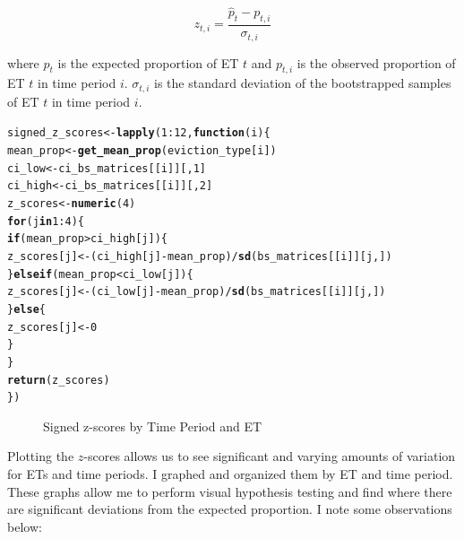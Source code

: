 \documentclass{article}\usepackage[]{graphicx}\usepackage[]{xcolor}
\makeatletter
\newcommand{\hlnum}[1]{\textcolor[rgb]{0.686,0.059,0.569}{#1}}%
\newcommand{\hlopt}[1]{\textcolor[rgb]{0,0,0}{#1}}%
\newcommand{\hlstd}[1]{\textcolor[rgb]{0.345,0.345,0.345}{#1}}%
\newcommand{\hlkwa}[1]{\textcolor[rgb]{0.161,0.373,0.58}{\textbf{#1}}}%
\newcommand{\hlkwb}[1]{\textcolor[rgb]{0.69,0.353,0.396}{#1}}%
\newcommand{\hlkwc}[1]{\textcolor[rgb]{0.333,0.667,0.333}{#1}}%
\newcommand{\hlkwd}[1]{\textcolor[rgb]{0.737,0.353,0.396}{\textbf{#1}}}%
\newenvironment{kframe}{%
 \def\at@end@of@kframe{}%
 \ifinner\ifhmode%
  \def\at@end@of@kframe{\end{minipage}}%
  \begin{minipage}{\columnwidth}%
 \fi\fi%
 \def\FrameCommand##1{\hskip\@totalleftmargin \hskip-\fboxsep
 \colorbox{shadecolor}{##1}\hskip-\fboxsep
     \hskip-\linewidth \hskip-\@totalleftmargin \hskip\columnwidth}%
 \MakeFramed {\advance\hsize-\width
   \@totalleftmargin\z@ \linewidth\hsize
   \@setminipage}}%
 {\par\unskip\endMakeFramed%
 \at@end@of@kframe}
\newenvironment{knitrout}{}{} %
\makeatother
\begin{document}
$$
z_{t,i} = \frac{\hat{p}_{t} - p_{t,i}}{\sigma_{t,i}}
$$

where $\hat{p}_{t}$ is the expected proportion of ET $t$ and $p_{t,i}$ is the observed proportion of ET $t$ in time period $i$. $\sigma_{t,i}$ is the standard deviation of the bootstrapped samples of ET $t$ in time period $i$.

\begin{knitrout}
\color{fgcolor}\begin{kframe}
\begin{alltt}
\hlstd{signed_z_scores} \hlkwb{<-} \hlkwd{lapply}\hlstd{(}\hlnum{1}\hlopt{:}\hlnum{12}\hlstd{,} \hlkwa{function}\hlstd{(}\hlkwc{i}\hlstd{) \{}
  \hlstd{mean_prop} \hlkwb{<-} \hlkwd{get_mean_prop}\hlstd{(eviction_type[i])}
  \hlstd{ci_low} \hlkwb{<-} \hlstd{ci_bs_matrices[[i]][,} \hlnum{1}\hlstd{]}
  \hlstd{ci_high} \hlkwb{<-} \hlstd{ci_bs_matrices[[i]][,} \hlnum{2}\hlstd{]}
  \hlstd{z_scores} \hlkwb{<-} \hlkwd{numeric}\hlstd{(}\hlnum{4}\hlstd{)}
  \hlkwa{for} \hlstd{(j} \hlkwa{in} \hlnum{1}\hlopt{:}\hlnum{4}\hlstd{) \{}
    \hlkwa{if} \hlstd{(mean_prop} \hlopt{>} \hlstd{ci_high[j]) \{}
      \hlstd{z_scores[j]} \hlkwb{<-} \hlstd{(ci_high[j]} \hlopt{-} \hlstd{mean_prop)} \hlopt{/} \hlkwd{sd}\hlstd{(bs_matrices[[i]][j, ])}
    \hlstd{\}} \hlkwa{else if} \hlstd{(mean_prop} \hlopt{<} \hlstd{ci_low[j]) \{}
      \hlstd{z_scores[j]} \hlkwb{<-} \hlstd{(ci_low[j]} \hlopt{-} \hlstd{mean_prop)} \hlopt{/} \hlkwd{sd}\hlstd{(bs_matrices[[i]][j, ])}
    \hlstd{\}} \hlkwa{else} \hlstd{\{}
      \hlstd{z_scores[j]} \hlkwb{<-} \hlnum{0}
    \hlstd{\}}
  \hlstd{\}}
  \hlkwd{return}\hlstd{(z_scores)}
\hlstd{\})}
\end{alltt}
\end{kframe}
\end{knitrout}

\begin{figure}[htbp]
  \centering
  \caption{Signed z-scores by Time Period and ET}
\end{figure}

Plotting the $z$-scores allows us to see significant and varying amounts of variation for ETs and time periods. I graphed and organized them by ET and time period. These graphs allow me to perform visual hypothesis testing and find where there are significant deviations from the expected proportion. I note some observations below:
\end{document}
